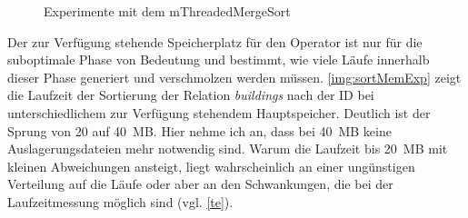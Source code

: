 \documentclass[a4paper,12pt,twoside]{article}
\newcommand{\Fb}[1]{\textit{#1}} %
\begin{document}
{\begin{figure}
	\centering
	\qquad
	\qquad
	\caption{Experimente mit dem mThreadedMergeSort}
	\label{img:sortExpAllg}
\end{figure}

Der zur Verfügung stehende Speicherplatz für den Operator ist nur für die suboptimale Phase von Bedeutung und bestimmt, wie viele Läufe innerhalb dieser Phase generiert und verschmolzen werden müssen. \autoref{img:sortMemExp} zeigt die Laufzeit der Sortierung der Relation \Fb{buildings} nach der ID bei unterschiedlichem zur Verfügung stehendem Hauptspeicher. Deutlich ist der Sprung von 20 auf 40~MB. Hier nehme ich an, dass bei 40~MB keine Auslagerungsdateien mehr notwendig sind. Warum die Laufzeit bis 20~MB mit kleinen Abweichungen ansteigt, liegt wahrscheinlich an einer ungünstigen Verteilung auf die Läufe oder aber an den Schwankungen, die bei der Laufzeitmessung möglich sind (vgl. \autoref{te}).


}
\end{document}

